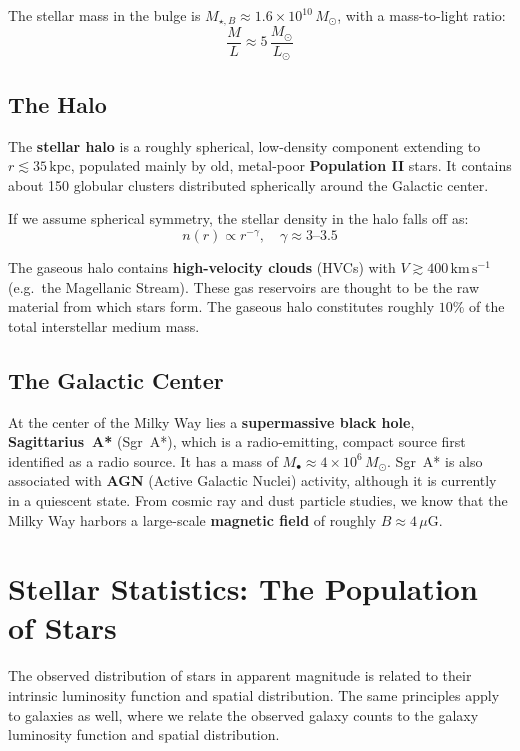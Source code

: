 The stellar mass in the bulge is $M_{\star,B} \approx 1.6 \times 10^{10}\,M_\odot$, with a mass-to-light ratio:
$$
\frac{M}{L} \approx 5\,\frac{M_\odot}{L_\odot}
$$

\subsection{The Halo}

The \textbf{stellar halo} is a roughly spherical, low-density component extending to $r \lesssim 35\,\mathrm{kpc}$, populated mainly by old, metal-poor \textbf{Population II} stars. It contains about 150 globular clusters distributed spherically around the Galactic center.

If we assume spherical symmetry, the stellar density in the halo falls off as:
$$
n(r) \propto r^{-\gamma}, \quad \gamma \approx 3\text{--}3.5
$$

The gaseous halo contains \textbf{high-velocity clouds} (HVCs) with $V \gtrsim 400\,\mathrm{km\,s^{-1}}$ (e.g.\ the Magellanic Stream). These gas reservoirs are thought to be the raw material from which stars form. The gaseous halo constitutes roughly $10\%$ of the total interstellar medium mass.

\subsection{The Galactic Center}

At the center of the Milky Way lies a \textbf{supermassive black hole}, \textbf{Sagittarius~A*} (Sgr~A*), which is a radio-emitting, compact source first identified as a radio source. It has a mass of $M_\bullet \approx 4 \times 10^6\,M_\odot$. Sgr~A* is also associated with \textbf{AGN} (Active Galactic Nuclei) activity, although it is currently in a quiescent state.
From cosmic ray and dust particle studies, we know that the Milky Way harbors a large-scale \textbf{magnetic field} of roughly $B \approx 4\,\mu\mathrm{G}$.

\section{Stellar Statistics: The Population of Stars}

The observed distribution of stars in apparent magnitude is related to their intrinsic luminosity function and spatial distribution. The same principles apply to galaxies as well, where we relate the observed galaxy counts to the galaxy luminosity function and spatial distribution.

